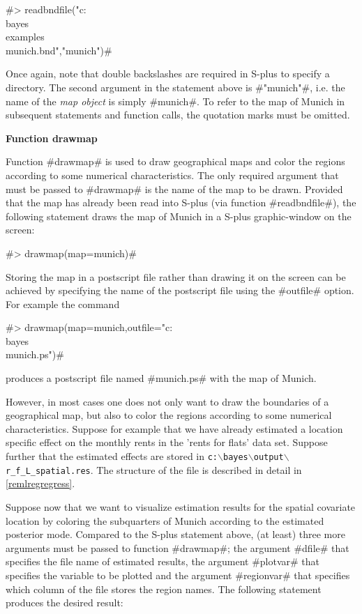 #> readbndfile("c:\\bayes\\examples\\munich.bnd","munich")#

Once again, note that double backslashes are required in S-plus to
specify a directory. The second argument in the statement above is
#"munich"#, i.e. the name of the {\em map object} is simply
#munich#. To refer to the map of Munich in subsequent statements
and function calls, the quotation marks must be omitted.

{\bf Function drawmap}
\medskip
{}

Function #drawmap# is used to draw geographical maps and color the
regions according to some numerical characteristics. The only
required argument that must be passed to #drawmap# is the name of
the map to be drawn. Provided that the map has already been read
into S-plus (via function #readbndfile#), the following statement
draws the map of Munich in a S-plus graphic-window on the screen:

#> drawmap(map=munich)#

Storing the map in a postscript file rather than drawing it on the
screen can be achieved by specifying the name of the postscript
file using the #outfile# option. For example the command

#> drawmap(map=munich,outfile="c:\\bayes\\munich.ps")#

produces a postscript file named #munich.ps# with the map of
Munich.

However, in most cases one does not only want to draw the
boundaries of a geographical map, but also to color the regions
according to some numerical characteristics. Suppose for example
that we have already estimated a location specific effect on the
monthly rents in the 'rents for flats' data set. Suppose further
that the estimated effects are stored in
\texttt{c:$\backslash$bayes$\backslash$output$\backslash$r\_f\_L\_spatial.res}.
The structure of the file is described in detail in
\autoref{remlregregress}.

Suppose now that we want to visualize estimation results for the
spatial covariate location by coloring the subquarters of Munich
according to the estimated posterior mode. Compared to the S-plus
statement above, (at least) three more arguments must be passed to
function  #drawmap#; the argument #dfile# that specifies the file
name of estimated results, the argument #plotvar# that specifies
the variable to be plotted and the argument #regionvar# that
specifies which column of the file stores the region names. The
following statement produces the desired result:

